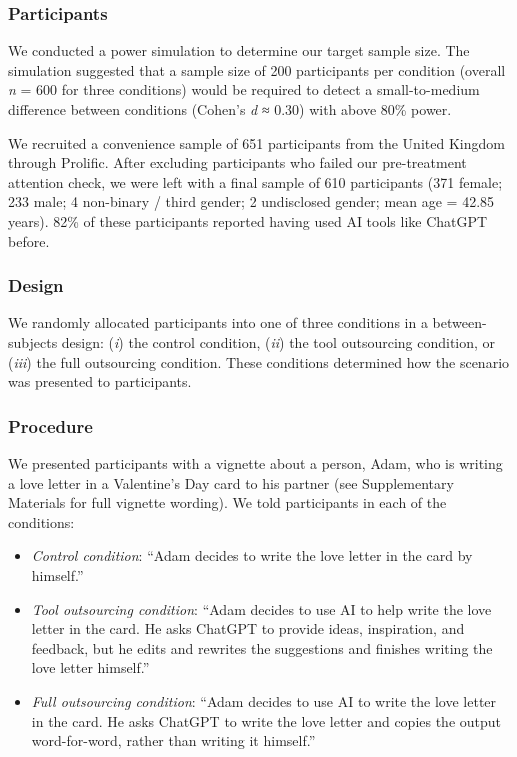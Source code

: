 \documentclass[
  man,
  floatsintext,
  longtable,
  nolmodern,
  notxfonts,
  notimes,
  colorlinks=true,linkcolor=blue,citecolor=blue,urlcolor=blue]{apa7}
\providecommand{\tightlist}{%
  \setlength{\itemsep}{0pt}\setlength{\parskip}{0pt}}
\begin{document}
\subsubsection*{Participants}\label{participants-4}

We conducted a power simulation to determine our target sample size. The
simulation suggested that a sample size of 200 participants per
condition (overall \emph{n} = 600 for three conditions) would be
required to detect a small-to-medium difference between conditions
(Cohen's \emph{d} ≈ 0.30) with above 80\% power.

We recruited a convenience sample of 651 participants from the United
Kingdom through Prolific. After excluding participants who failed our
pre-treatment attention check, we were left with a final sample of 610
participants (371 female; 233 male; 4 non-binary / third gender; 2
undisclosed gender; mean age = 42.85 years). 82\% of these participants
reported having used AI tools like ChatGPT before.

\subsubsection*{Design}\label{design-4}

We randomly allocated participants into one of three conditions in a
between-subjects design: (\emph{i}) the control condition, (\emph{ii})
the tool outsourcing condition, or (\emph{iii}) the full outsourcing
condition. These conditions determined how the scenario was presented to
participants.

\subsubsection*{Procedure}\label{procedure-4}

We presented participants with a vignette about a person, Adam, who is
writing a love letter in a Valentine's Day card to his partner (see
Supplementary Materials for full vignette wording). We told participants
in each of the conditions:

\begin{itemize}
\tightlist
\item
  \emph{Control condition}: ``Adam decides to write the love letter in
  the card by himself.''
\item
  \emph{Tool outsourcing condition}: ``Adam decides to use AI to help
  write the love letter in the card. He asks ChatGPT to provide ideas,
  inspiration, and feedback, but he edits and rewrites the suggestions
  and finishes writing the love letter himself.''
\item
  \emph{Full outsourcing condition}: ``Adam decides to use AI to write
  the love letter in the card. He asks ChatGPT to write the love letter
  and copies the output word-for-word, rather than writing it himself.''
\end{itemize}
\end{document}
